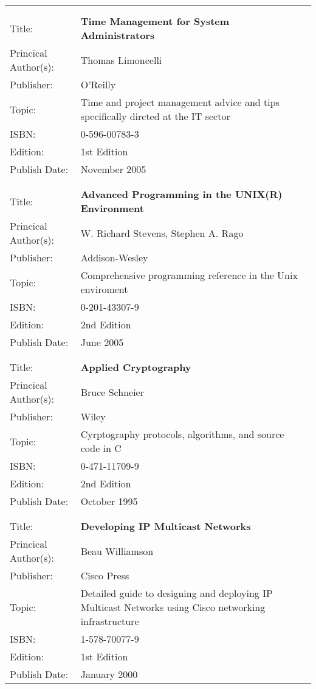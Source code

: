 \begin{tabular}{ll}
	&	\\
	&	\\
	
Title: &	\textbf{Time Management for System Administrators}	\\
Princical Author(s): &	Thomas Limoncelli  \\
Publisher:&	O'Reilly	\\	
Topic:	&	Time and project management advice and tips specifically dircted at the IT sector \\
ISBN:		&	0-596-00783-3 \\
Edition:	&	1st Edition \\
Publish Date:	&	November 2005 \\

	&	\\
	&	\\
	
Title: &	\textbf{Advanced Programming in the UNIX(R) Environment}	\\
Princical Author(s): &	W. Richard Stevens, Stephen A. Rago  \\
Publisher:&	Addison-Wesley	\\	
Topic:	&	Comprehensive programming reference in the Unix enviroment \\
ISBN:		&	0-201-43307-9 \\
Edition:	&	2nd Edition \\
Publish Date:	&	June 2005 \\

	&	\\
	&	\\

Title: &	\textbf{Applied Cryptography}	\\
Princical Author(s): &	Bruce Schneier  \\
Publisher:&	Wiley	\\	
Topic:	&	Cyrptography protocols, algorithms, and source code in C \\
ISBN:		&	0-471-11709-9 \\
Edition:	&	2nd Edition \\
Publish Date:	&	October 1995 \\

	&	\\
	&	\\

Title: &	\textbf{Developing IP Multicast Networks}	\\
Princical Author(s): &	Beau Williamson  \\
Publisher:&	Cisco Press	\\	
Topic:	&	Detailed guide to designing and deploying IP Multicast Networks using Cisco networking infrastructure \\
ISBN:		&	1-578-70077-9 \\
Edition:	&	1st Edition \\
Publish Date:	&	January 2000 \\


\end{tabular}
